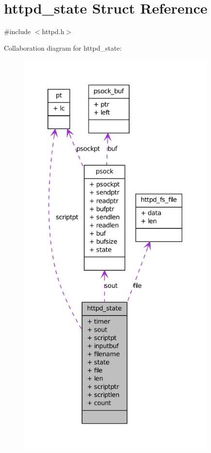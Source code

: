 \hypertarget{structhttpd__state}{
\section{httpd\_\-state Struct Reference}
\label{structhttpd__state}
}


{\ttfamily \#include $<$httpd.h$>$}



Collaboration diagram for httpd\_\-state:
\nopagebreak
\begin{figure}[H]
\begin{center}
\leavevmode
\includegraphics[height=600pt]{structhttpd__state__coll__graph}
\end{center}
\end{figure}
